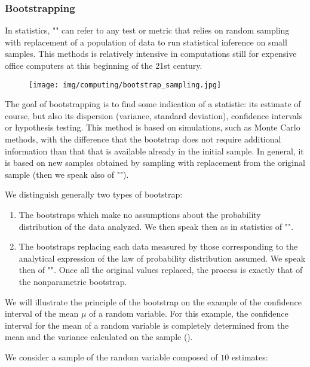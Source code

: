 	\subsubsection{Bootstrapping}\label{bootstrap}
	In statistics, "" can refer to any test or metric that relies on random sampling with replacement of a population of data to run statistical inference on small samples. This methods is relatively intensive in computations still for expensive office computers at this beginning of the 21st century.  
	\begin{figure}[H]
		\centering
		\texttt{[image: img/computing/bootstrap\_sampling.jpg]}
	\end{figure}
	The goal of bootstrapping is to find some indication of a statistic: its estimate of course, but also its dispersion (variance, standard deviation), confidence intervals or hypothesis testing. This method is based on simulations, such as Monte Carlo methods, with the difference that the bootstrap does not require additional information than that that is available already in the initial sample. In general, it is based on new samples obtained by sampling with replacement from the original sample (then we speak also of "").
	
	We distinguish generally two types of bootstrap:
	\begin{enumerate}
		\item The bootstraps which make no assumptions about the probability distribution of the data analyzed. We then speak then as in statistics of "".

		\item The bootstraps replacing each data measured by those corresponding to the analytical expression of the law of probability distribution assumed. We speak then of "". Once all the original values replaced, the process is exactly that of the nonparametric bootstrap.
	\end{enumerate}
	We will illustrate the principle of the bootstrap on the example of the confidence interval of the mean $\mu$ of a random variable. For this example, the confidence interval for the mean of a random variable is completely determined from the mean and the variance calculated on the sample ().

	We consider a sample of the random variable composed of $10$ estimates:
	
